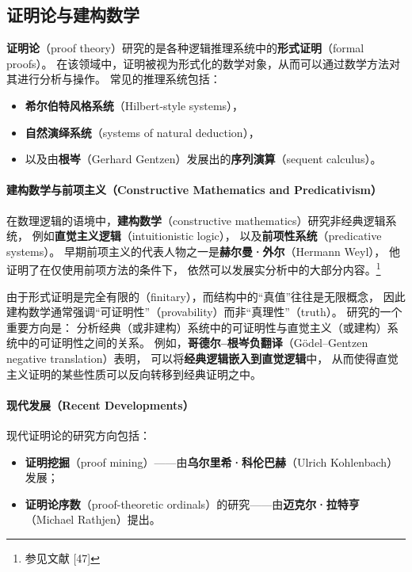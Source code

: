 \subsection{证明论与建构数学}
\textbf{证明论}（proof theory）研究的是各种逻辑推理系统中的\textbf{形式证明}（formal proofs）。  
在该领域中，证明被视为形式化的数学对象，从而可以通过数学方法对其进行分析与操作。  
常见的推理系统包括：
\begin{itemize}
  \item \textbf{希尔伯特风格系统}（Hilbert-style systems），
  \item \textbf{自然演绎系统}（systems of natural deduction），
  \item 以及由\textbf{根岑}（Gerhard Gentzen）发展出的\textbf{序列演算}（sequent calculus）。
\end{itemize}

\paragraph{建构数学与前项主义（Constructive Mathematics and Predicativism）}
在数理逻辑的语境中，\textbf{建构数学}（constructive mathematics）研究非经典逻辑系统，  
例如\textbf{直觉主义逻辑}（intuitionistic logic），  
以及\textbf{前项性系统}（predicative systems）。  
早期前项主义的代表人物之一是\textbf{赫尔曼·外尔}（Hermann Weyl），  
他证明了在仅使用前项方法的条件下，  
依然可以发展实分析中的大部分内容。\footnote{参见文献 [47]}  

由于形式证明是完全有限的（finitary），而结构中的“真值”往往是无限概念，
因此建构数学通常强调“可证明性”（provability）而非“真理性”（truth）。
研究的一个重要方向是：  
分析经典（或非建构）系统中的可证明性与直觉主义（或建构）系统中的可证明性之间的关系。  
例如，\textbf{哥德尔–根岑负翻译}（Gödel–Gentzen negative translation）表明，
可以将\textbf{经典逻辑嵌入到直觉逻辑}中，  
从而使得直觉主义证明的某些性质可以反向转移到经典证明之中。

\paragraph{现代发展（Recent Developments）}
现代证明论的研究方向包括：
\begin{itemize}
  \item \textbf{证明挖掘}（proof mining）——由\textbf{乌尔里希·科伦巴赫}（Ulrich Kohlenbach）发展；
  \item \textbf{证明论序数}（proof-theoretic ordinals）的研究——由\textbf{迈克尔·拉特亨}（Michael Rathjen）提出。
\end{itemize}

